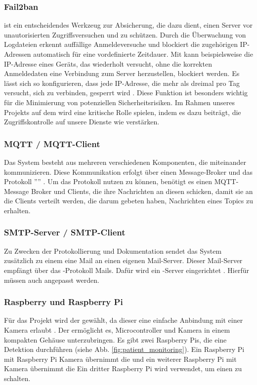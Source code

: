 \subsubsection{Fail2ban}
 ist ein entscheidendes Werkzeug zur Absicherung, die dazu dient, einen Server vor unautorisierten Zugriffsversuchen und  zu schützen. Durch die Überwachung von Logdateien erkennt  auffällige Anmeldeversuche und blockiert die zugehörigen IP-Adressen automatisch für eine vordefinierte Zeitdauer. Mit  kann beispielsweise die IP-Adresse eines Geräts, das wiederholt versucht, ohne die korrekten Anmeldedaten eine Verbindung zum Server herzustellen, blockiert werden. Es lässt sich so konfigurieren, dass jede IP-Adresse, die mehr als dreimal pro Tag versucht, sich zu verbinden, gesperrt wird \cite{Fail2ban}. Diese Funktion ist besonders wichtig für die Minimierung von potenziellen Sicherheitsrisiken. Im Rahmen unseres Projekts auf dem  wird  eine kritische Rolle spielen, indem es dazu beiträgt, die Zugriffskontrolle auf unsere Dienste wie  verstärken.

\subsubsection{MQTT / MQTT-Client}
Das System besteht aus mehreren verschiedenen Komponenten, die miteinander kommunizieren. Diese Kommunikation erfolgt über einen Message-Broker und das Protokoll '''' \cite{MQTT}. Um das Protokoll nutzen zu können, benötigt es einen MQTT-Message Broker und Clients, die ihre Nachrichten an diesen schicken, damit sie an die Clients verteilt werden, die darum gebeten haben, Nachrichten eines Topics zu erhalten.

\subsubsection{SMTP-Server / SMTP-Client}
Zu Zwecken der Protokollierung und Dokumentation sendet das System zusätzlich zu einem  eine Mail an einen eigenen Mail-Server. Dieser Mail-Server empfängt über das -Protokoll Mails. Dafür wird ein -Server eingerichtet \cite{Mailcow}. Hierfür müssen auch  angepasst werden.

\subsubsection{Raspberry und Raspberry Pi} \label{sec:raspi}
Für das Projekt wird der  gewählt, da dieser eine einfache Anbindung mit einer Kamera erlaubt \cite{Raspberry} \cite{Raspberry_camera}. Der  ermöglicht es, Microcontroller und Kamera in einem kompakten Gehäuse unterzubringen. Es gibt zwei Raspberry Pis, die eine Detektion durchführen (siehe Abb. \ref{fig:patient_monitoring}). Ein Raspberry Pi mit Raspberry Pi Kamera übernimmt die  und ein weiterer Raspberry Pi mit Kamera übernimmt die  Ein dritter Raspberry Pi wird verwendet, um einen  zu schalten.


